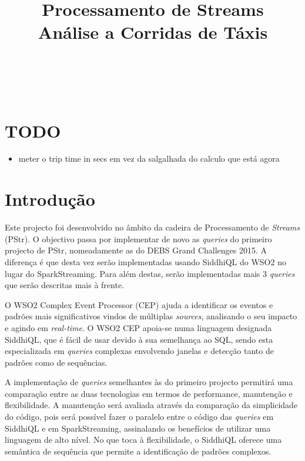 \documentclass[article]{IEEEtran}
\begin{document}
\title{Processamento de Streams\\Análise a Corridas de Táxis}


\author{\\
\and
{}\\
}

\maketitle
\section{TODO}
\begin{itemize}
    \item meter o trip time in secs em vez da salgalhada do calculo que está agora
\end{itemize}

\section{Introdução}
Este projecto foi desenvolvido no âmbito da cadeira de Processamento de \textit{Streams} (PStr). O objectivo passa por implementar de novo as \textit{queries} do primeiro projecto de PStr, nomeadamente as do  DEBS Grand Challenges 2015. A diferença é que desta vez serão implementadas usando SiddhiQL do WSO2 no lugar do SparkStreaming. Para além destas, serão implementadas mais 3 \textit{queries} que serão descritas mais à frente.

O WSO2 Complex Event Processor (CEP) ajuda a identificar os eventos e padrões mais significativos vindos de múltiplas \textit{sources}, analisando o seu impacto e agindo em \textit{real-time}. O WSO2 CEP apoia-se numa linguagem designada SiddhiQL, que é fácil de usar devido à sua semelhança ao SQL, sendo esta especializada em \textit{queries} complexas envolvendo janelas e detecção tanto de padrões como de sequências.


A implementação de \textit{queries} semelhantes às do primeiro projecto permitirá uma comparação entre as duas tecnologias em termos de performance, manutenção e flexibilidade. A manutenção será avaliada através da comparação da simplicidade do código, pois será possível fazer o paralelo entre o código das \textit{queries} em SiddhiQL e em SparkStreaming, assinalando os benefícios de utilizar uma linguagem de alto nível. No que toca à flexibilidade, o SiddhiQL oferece uma semântica de sequência que permite a identificação de padrões complexos.
\end{document}
